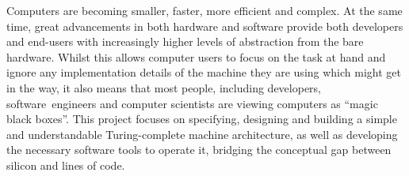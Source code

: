 Computers are becoming smaller, faster, more efficient and complex. At the same time,
great advancements in both hardware and software provide both developers and end-users with increasingly
higher levels of abstraction from the bare hardware. Whilst this allows computer users to focus on the
task at hand and ignore any implementation details of the machine they are using which might get in the way,
it also means that most people, including developers, \mbox{software engineers} and computer scientists are viewing
computers as ``magic black boxes''. This project focuses on specifying, designing and building a simple and understandable Turing-complete machine architecture, as well as developing the necessary software tools to operate it, bridging the conceptual gap between silicon and lines of code.
